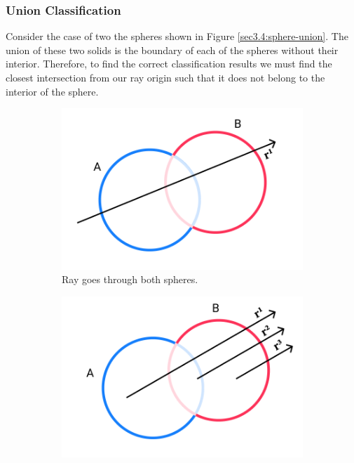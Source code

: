 \documentclass[a4paper,11pt,oneside]{article}
\begin{document}
\subsubsection{Union Classification}

Consider the case of two the spheres shown in Figure \ref{sec3.4:sphere-union}. The union of these two solids is the boundary of each of the spheres without their interior. Therefore, to find the correct classification results we must find the closest intersection from our ray origin such that it does not belong to the interior of the sphere.

\begin{figure}[ht]
	\centering
	\begin{subfigure}[b]{0.3\textwidth}
		\centering
		\includegraphics[width=\textwidth]{section4/4.1/union-case-1.png}
		\caption{Ray goes through both spheres.}
		\label{sec3.4:union-case1}
	\end{subfigure}
	\hfill
	\begin{subfigure}[b]{0.3\textwidth}
		\centering
		\includegraphics[width=\textwidth]{section4/4.1/union-case-2.png}

\end{subfigure}
\end{figure}
\end{document}
